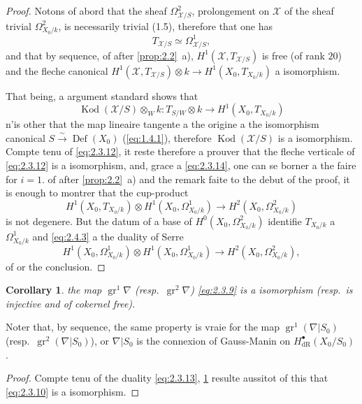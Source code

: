 \documentclass[12pt,a4paper]{article}
\theoremstyle{plain}
\newtheorem{corollary}[theorem]{Corollary}
\theoremstyle{definition}
\theoremstyle{remark}
\DeclareMathOperator{\Def}{Def}
\DeclareMathOperator{\gr}{gr}
\DeclareMathOperator{\Kod}{Kod}
\begin{document}
\begin{proof}
Notons of abord that the sheaf $\Omega^2_{\mathcal{X}/S}$, prolongement on $\mathcal{X}$ of the sheaf trivial $\Omega^2_{X_0/k}$, is necessarily trivial (1.5), therefore that one has
\begin{equation}\label{eq:2.4.1}
T_{\mathcal{X}/S} \simeq \Omega^1_{\mathcal{X}/S},
\end{equation}
and that by sequence, of after \ref{prop:2.2}~a), $H^1(\mathcal{X}, T_{\mathcal{X}/S})$ is free (of rank $20$) and the fleche canonical $H^1(\mathcal{X}, T_{\mathcal{X}/S}) \otimes k \to H^1(X_0, T_{X_0/k})$ a isomorphism.

That being, a argument standard shows that
\begin{equation}\label{eq:2.4.2}
\Kod(\mathcal{X}/S) \otimes_W k: T_{S/W} \otimes k \to H^1(X_0, T_{X_0/k})
\end{equation}
n'is other that the map lineaire tangente a the origine a the isomorphism canonical $S \xrightarrow{\sim} \Def(X_0)$ (\eqref{eq:1.4.1}), therefore $\Kod(\mathcal{X}/S)$ is a isomorphism. Compte tenu of \eqref{eq:2.3.12}, it reste therefore a prouver that the fleche verticale of \eqref{eq:2.3.12} is a isomorphism, and, grace a \eqref{eq:2.3.14}, one can se borner a the faire for $i = 1$. of after \ref{prop:2.2}~a) and the remark faite to the debut of the proof, it is enough to montrer that the cup-product
\begin{equation}\label{eq:2.4.3}
H^1(X_0, T_{X_0/k}) \otimes H^1(X_0, \Omega^1_{X_0/k}) \to H^2(X_0, \Omega^2_{X_0/k})
\end{equation}
is not degenere. But the datum of a base of $H^0(X_0, \Omega^2_{X_0/k})$ identifie $T_{X_0/k}$ a $\Omega^1_{X_0/k}$ and \eqref{eq:2.4.3} a the duality of Serre
\[
H^1(X_0, \Omega^1_{X_0/k}) \otimes H^1(X_0, \Omega^1_{X_0/k}) \to H^2(X_0, \Omega^2_{X_0/k}),
\]
of or the conclusion.
\end{proof}

\begin{corollary}\label{cor:2.4.4}
the map $\gr^1 \nabla$ (resp.~$\gr^2 \nabla$) \eqref{eq:2.3.9} is a isomorphism (resp.~is injective and of cokernel free).
\end{corollary}

Noter that, by sequence, the same property is vraie for the map $\gr^1(\nabla|S_0)$ (resp.~$\gr^2(\nabla|S_0)$), or $\nabla|S_0$ is the connexion of Gauss-Manin on $H^{\bullet}_{\mathrm{dR}}(X_0/S_0)$.

\begin{proof}
Compte tenu of the duality \eqref{eq:2.3.13}, \ref{cor:2.4.4} resulte aussitot of this that \eqref{eq:2.3.10} is a isomorphism.
\end{proof}
\end{document}
